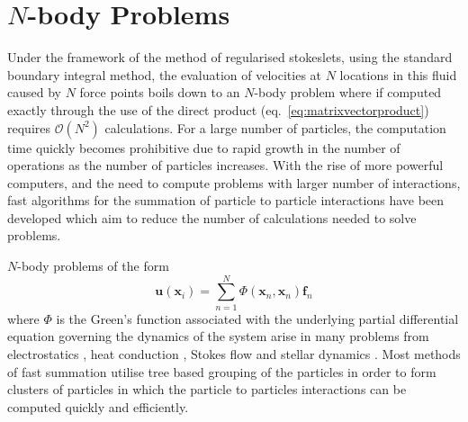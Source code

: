 \FloatBarrier
\section{\texorpdfstring{$N$-body Problems}{N-body Problems}} \label{sec:Nbody}

Under the framework of the method of regularised stokeslets, using the standard boundary integral method, the evaluation of velocities at $N$ locations in this fluid caused by $N$ force points boils down to an $N$-body problem where if computed exactly through the use of the direct product (eq.~\ref{eq:matrixvectorproduct}) requires $\mathcal{O}(N^2)$ calculations. For a large number of particles, the computation time quickly becomes prohibitive due to rapid growth in the number of operations as the number of particles increases. With the rise of more powerful computers, and the need to compute problems with larger number of interactions, fast algorithms for the summation of particle to particle interactions have been developed which aim to reduce the number of calculations needed to solve problems. 

$N$-body problems of the form
\begin{equation*}
    \bm{u}(\bm{x}_i) = \sum_{n=1}^N \Phi(\bm{x}_n,{\bm{x}}_n){\bm{f}}_n
\end{equation*}
where $\Phi$ is the Green's function associated with the underlying partial differential equation governing the dynamics of the system arise in many problems from electrostatics \cite{Beatson,Tornberg2008}, heat conduction \cite{Greengard1990APotentials}, Stokes flow \cite{Cortez2015,Tornberg2008} and stellar dynamics \cite{Dehnen2014ADynamics}. Most methods of fast summation utilise tree based grouping of the particles in order to form clusters of particles in which the particle to particles interactions can be computed quickly and efficiently. 

